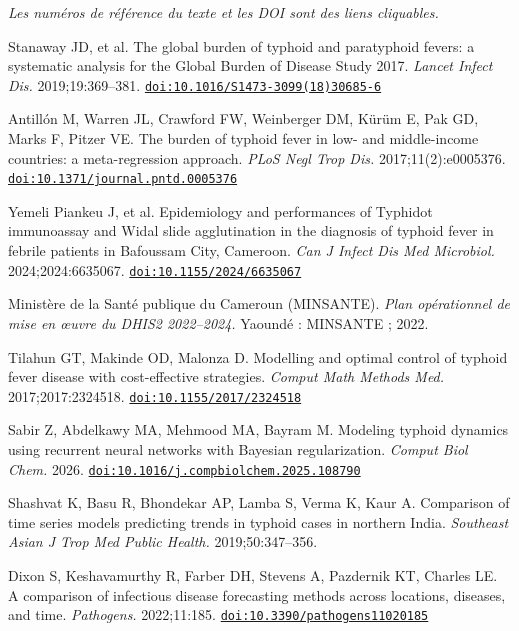 \documentclass[11pt]{article}
\begin{document}
\noindent\textit{Les numéros de référence du texte et les DOI sont des liens cliquables.}
\begin{enumerate}[label={[\arabic*]},leftmargin=2.2em,itemsep=0.5pt]
\item\hypertarget{ref1}{}Stanaway JD, et al. The global burden of typhoid and paratyphoid fevers: a systematic analysis for the Global Burden of Disease Study 2017. \textit{Lancet Infect Dis.} 2019;19:369--381. \href{https://doi.org/10.1016/S1473-3099(18)30685-6}{\nolinkurl{doi:10.1016/S1473-3099(18)30685-6}}
\item\hypertarget{ref2}{}Antillón M, Warren JL, Crawford FW, Weinberger DM, Kürüm E, Pak GD, Marks F, Pitzer VE. The burden of typhoid fever in low- and middle-income countries: a meta-regression approach. \textit{PLoS Negl Trop Dis.} 2017;11(2):e0005376. \href{https://doi.org/10.1371/journal.pntd.0005376}{\nolinkurl{doi:10.1371/journal.pntd.0005376}}
\item\hypertarget{ref3}{}Yemeli Piankeu J, et al. Epidemiology and performances of Typhidot immunoassay and Widal slide agglutination in the diagnosis of typhoid fever in febrile patients in Bafoussam City, Cameroon. \textit{Can J Infect Dis Med Microbiol.} 2024;2024:6635067. \href{https://doi.org/10.1155/2024/6635067}{\nolinkurl{doi:10.1155/2024/6635067}}
\item\hypertarget{ref4}{}Ministère de la Santé publique du Cameroun (MINSANTE). \textit{Plan opérationnel de mise en œuvre du DHIS2 2022--2024.} Yaoundé : MINSANTE ; 2022.
\item\hypertarget{ref5}{}Tilahun GT, Makinde OD, Malonza D. Modelling and optimal control of typhoid fever disease with cost-effective strategies. \textit{Comput Math Methods Med.} 2017;2017:2324518. \href{https://doi.org/10.1155/2017/2324518}{\nolinkurl{doi:10.1155/2017/2324518}}
\item\hypertarget{ref6}{}Sabir Z, Abdelkawy MA, Mehmood MA, Bayram M. Modeling typhoid dynamics using recurrent neural networks with Bayesian regularization. \textit{Comput Biol Chem.} 2026. \href{https://doi.org/10.1016/j.compbiolchem.2025.108790}{\nolinkurl{doi:10.1016/j.compbiolchem.2025.108790}}
\item\hypertarget{ref7}{}Shashvat K, Basu R, Bhondekar AP, Lamba S, Verma K, Kaur A. Comparison of time series models predicting trends in typhoid cases in northern India. \textit{Southeast Asian J Trop Med Public Health.} 2019;50:347--356.
\item\hypertarget{ref8}{}Dixon S, Keshavamurthy R, Farber DH, Stevens A, Pazdernik KT, Charles LE. A comparison of infectious disease forecasting methods across locations, diseases, and time. \textit{Pathogens.} 2022;11:185. \href{https://doi.org/10.3390/pathogens11020185}{\nolinkurl{doi:10.3390/pathogens11020185}}

\end{enumerate}
\end{document}
